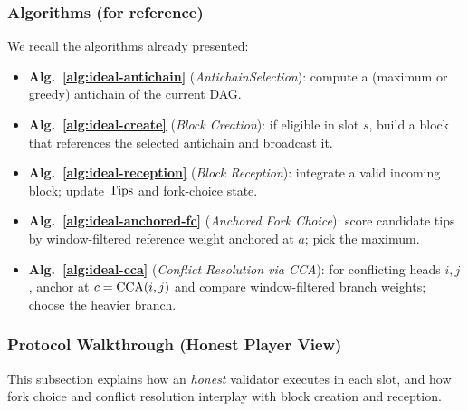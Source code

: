 \subsubsection{Algorithms (for reference)}
We recall the algorithms already presented:
\begin{itemize}
  \item \textbf{Alg.~\ref{alg:ideal-antichain}} (\emph{AntichainSelection}): compute a (maximum or greedy) antichain of the current DAG.
  \item \textbf{Alg.~\ref{alg:ideal-create}} (\emph{Block Creation}): if eligible in slot $s$, build a block that references the selected antichain and broadcast it.
  \item \textbf{Alg.~\ref{alg:ideal-reception}} (\emph{Block Reception}): integrate a valid incoming block; update $\mathrm{Tips}$ and fork-choice state.
  \item \textbf{Alg.~\ref{alg:ideal-anchored-fc}} (\emph{Anchored Fork Choice}): score candidate tips by window-filtered reference weight anchored at $a$; pick the maximum.
  \item \textbf{Alg.~\ref{alg:ideal-cca}} (\emph{Conflict Resolution via CCA}): for conflicting heads $i,j$, anchor at $c=\mathrm{CCA}(i,j)$ and compare window-filtered branch weights; choose the heavier branch.
\end{itemize}

\subsubsection{Protocol Walkthrough (Honest Player View)}
\label{subsec:ideal-walkthrough}
This subsection explains how an \emph{honest} validator executes \ProjIdeal in each slot, and how fork choice and conflict resolution interplay with block creation and reception.

